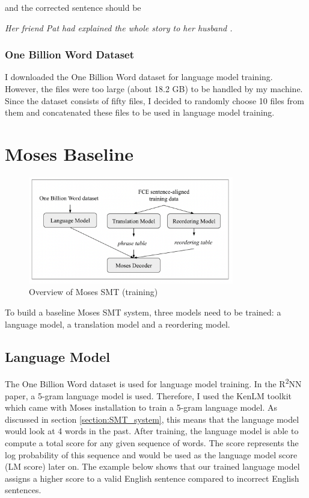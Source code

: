 \documentclass[12pt,a4paper,twoside,openright]{report}
\begin{document}
and the corrected sentence should be

\textit{Her friend Pat had explained the whole story to her husband .}

\subsubsection{One Billion Word Dataset}

I downloaded the One Billion Word dataset for language model training. However, the files were too large (about 18.2 GB) to be handled by my machine. Since the dataset consists of fifty files, I decided to randomly choose 10 files from them and concatenated these files to be used in language model training. 


\section{Moses Baseline} \label{section:moses_baseline}

\begin{figure}[ht]
\centering
\includegraphics[width=0.8\textwidth]{images/moses_pipeline.png}
\caption{Overview of Moses SMT (training)}
\label{fig:moses_pipeline}
\end{figure}

To build a baseline Moses SMT system, three models need to be trained: a language model, a translation model and a reordering model.

\subsection{Language Model}\label{section:moses_lm}
The One Billion Word dataset is used for language model training. In the R\textsuperscript{2}NN paper, a 5-gram language model is used. Therefore, I used the KenLM toolkit which came with Moses installation to train a 5-gram language model. As discussed in section \ref{section:SMT_system}, this means that the language model would look at 4 words in the past. After training, the language model is able to compute a total score for any given sequence of words. The score represents the log probability of this sequence and would be used as the language model score (LM score) later on. The example below shows that our trained language model assigns a higher score to a valid English sentence compared to incorrect English sentences.
\end{document}
